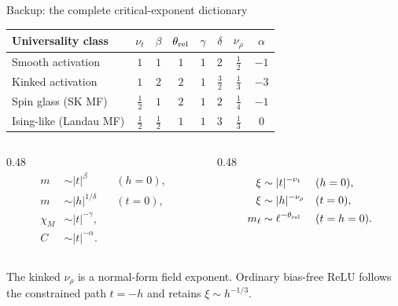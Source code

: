 \documentclass[aspectratio=169,10pt]{beamer}
\newcommand{\relu}{\mathrm{ReLU}}
\newcommand{\regularpagechrome}{}
\begin{document}
\begin{frame}{Backup: the complete critical-exponent dictionary}
  \begin{center}
    \small
    \setlength{\tabcolsep}{3.5pt}
    \renewcommand{\arraystretch}{1.10}
    \begin{tabular}{@{}lccccccc@{}}
      \toprule
      Universality class & \(\nu_t\) & \(\beta\) & \(\theta_{\rm rel}\) & \(\gamma\) & \(\delta\) & \(\nu_\rho\) & \(\alpha\) \\
      \midrule
      Smooth activation & \(1\) & \(1\) & \(1\) & \(1\) & \(2\) & \(\tfrac12\) & \(-1\) \\
      Kinked activation & \(1\) & \(2\) & \(2\) & \(1\) & \(\tfrac32\) & \(\tfrac13\) & \(-3\) \\
      Spin glass (SK MF) & \(\tfrac12\) & \(1\) & \(2\) & \(1\) & \(2\) & \(\tfrac14\) & \(-1\) \\
      Ising-like (Landau MF) & \(\tfrac12\) & \(\tfrac12\) & \(1\) & \(1\) & \(3\) & \(\tfrac13\) & \(0\) \\
      \bottomrule
    \end{tabular}
  \end{center}

  \vspace{0.30em}
  \begin{columns}[T,onlytextwidth]
    \begin{column}{0.48\textwidth}
      \small
      \setlength{\jot}{1.5pt}
      \begin{align*}
        m&\sim |t|^\beta &&(h=0),\\
        m&\sim |h|^{1/\delta} &&(t=0),\\
        \chi_M&\sim |t|^{-\gamma},\\
        C&\sim |t|^{-\alpha}.
      \end{align*}
    \end{column}
    \begin{column}{0.48\textwidth}
      \small
      \setlength{\jot}{1.5pt}
      \begin{align*}
        \xi&\sim |t|^{-\nu_t} &&(h=0),\\
        \xi&\sim |h|^{-\nu_\rho} &&(t=0),\\
        m_\ell&\sim \ell^{-\theta_{\rm rel}} &&(t=h=0).
      \end{align*}
    \end{column}
  \end{columns}

  \vspace{0.20em}
  {\scriptsize\color{muted}The kinked \(\nu_\rho\) is a normal-form field exponent. Ordinary bias-free \(\relu\) follows the constrained path \(t=-h\) and retains \(\xi\sim h^{-1/3}\).}
  \regularpagechrome
\end{frame}
\end{document}
